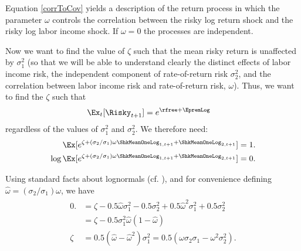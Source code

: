 \documentclass{handout}
\begin{document}
Equation \eqref{corrToCov} yields a description of the return process
in which the parameter $\omega$ controls the correlation between the
risky log return shock and the risky log labor income shock.  If
$\omega = 0$ the processes are independent.

Now we want to find the value of $\zeta$ such that the mean risky
return is unaffected by $\sigma^{2}_{1}$ (so that we will be able to
understand clearly the distinct effects of labor income risk, the
independent component of rate-of-return risk $\sigma^{2}_{2}$, and the
correlation between labor income risk and rate-of-return risk,
$\omega$).  Thus, we want to find the $\zeta$ such that
\begin{equation}\begin{gathered}\begin{aligned}
  \Ex_{t}[\Risky_{t+1}] & =  e^{\rfree+\EpremLog}
\end{aligned}\end{gathered}\end{equation}
regardless of the values of $\sigma^{2}_{1}$ and $\sigma^{2}_{2}$.  We therefore need:
\begin{equation}\begin{gathered}\begin{aligned}
         \Ex[e^{\zeta+ (\sigma_{2}/\sigma_{1}) \omega \ShkMeanOneLog_{1,t+1}  + \ShkMeanOneLog_{2,t+1}}] & =  1.
\\ \log  \Ex[e^{\zeta+ (\sigma_{2}/\sigma_{1}) \omega \ShkMeanOneLog_{1,t+1}  + \ShkMeanOneLog_{2,t+1}}] & =  0.
\end{aligned}\end{gathered}\end{equation}

Using standard facts about lognormals (cf. \MathFactsList), and for convenience 
defining $\hat{\omega}= (\sigma_{2}/\sigma_{1}) \omega$, we have 
\begin{equation}\begin{gathered}\begin{aligned}
  0. & =  \zeta - 0.5 \hat{\omega} \sigma^{2}_{1} - 0.5 \sigma^{2}_{2} + 0.5\hat{\omega}^{2}\sigma^{2}_{1}+0.5  \sigma^{2}_{2}
\\ & =  \zeta -0.5 \sigma^{2}_{1} \hat{\omega}(1-\hat{\omega})
\\ \zeta & =  0.5 (\hat{\omega}-\hat{\omega}^{2}) \sigma^{2}_{1} = 0.5 (\omega \sigma_{2} \sigma_{1}-\omega^{2} \sigma^{2}_{2}).
\end{aligned}\end{gathered}\end{equation}
\end{document}
